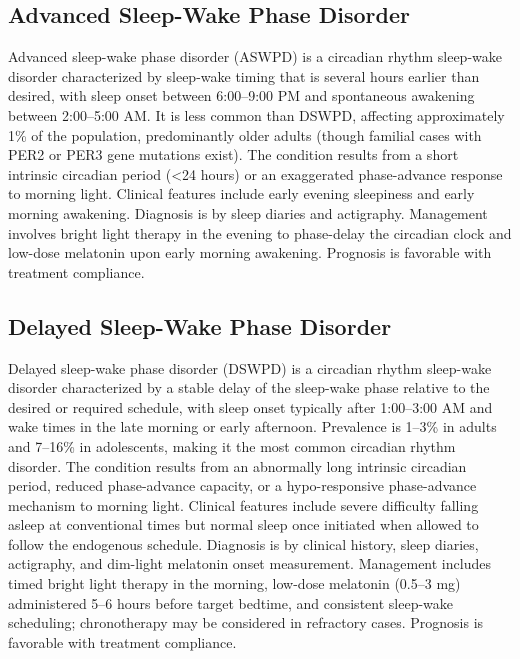 \subsection{Advanced Sleep-Wake Phase Disorder}
\label{sec:Advanced Sleep-Wake Phase Disorder}
Advanced sleep-wake phase disorder (ASWPD) is a circadian rhythm sleep-wake disorder characterized by sleep-wake timing that is several hours earlier than desired, with sleep onset between 6:00--9:00 PM and spontaneous awakening between 2:00--5:00 AM. It is less common than DSWPD, affecting approximately 1\% of the population, predominantly older adults (though familial cases with PER2 or PER3 gene mutations exist). The condition results from a short intrinsic circadian period (<24 hours) or an exaggerated phase-advance response to morning light. Clinical features include early evening sleepiness and early morning awakening. Diagnosis is by sleep diaries and actigraphy. Management involves bright light therapy in the evening to phase-delay the circadian clock and low-dose melatonin upon early morning awakening. Prognosis is favorable with treatment compliance.

\subsection{Delayed Sleep-Wake Phase Disorder}
\label{sec:Delayed Sleep-Wake Phase Disorder}
Delayed sleep-wake phase disorder (DSWPD) is a circadian rhythm sleep-wake disorder characterized by a stable delay of the sleep-wake phase relative to the desired or required schedule, with sleep onset typically after 1:00--3:00 AM and wake times in the late morning or early afternoon. Prevalence is 1--3\% in adults and 7--16\% in adolescents, making it the most common circadian rhythm disorder. The condition results from an abnormally long intrinsic circadian period, reduced phase-advance capacity, or a hypo-responsive phase-advance mechanism to morning light. Clinical features include severe difficulty falling asleep at conventional times but normal sleep once initiated when allowed to follow the endogenous schedule. Diagnosis is by clinical history, sleep diaries, actigraphy, and dim-light melatonin onset measurement. Management includes timed bright light therapy in the morning, low-dose melatonin (0.5--3 mg) administered 5--6 hours before target bedtime, and consistent sleep-wake scheduling; chronotherapy may be considered in refractory cases. Prognosis is favorable with treatment compliance.

